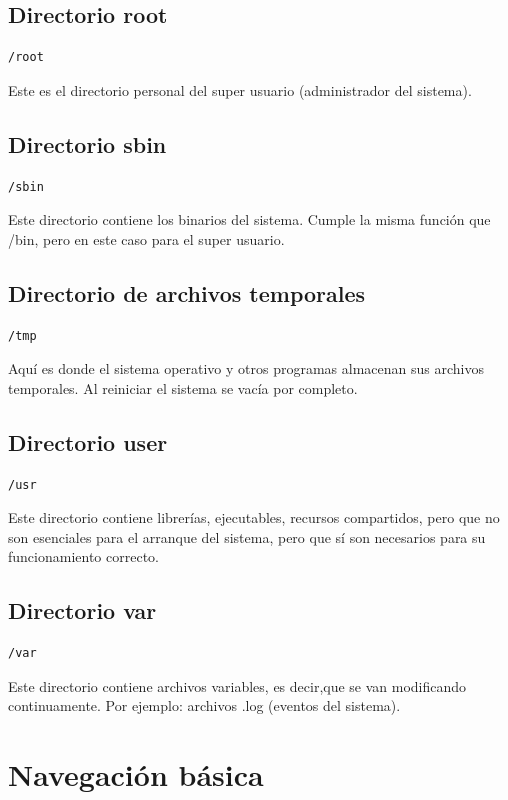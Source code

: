 \subsection{Directorio root}
\begin{lstlisting}
/root
\end{lstlisting}
Este es el directorio personal del super usuario (administrador del sistema).

\subsection{Directorio sbin}
\begin{lstlisting}
/sbin
\end{lstlisting}
Este directorio contiene los binarios del sistema. Cumple la misma función que /bin, pero en este caso para el super usuario.

\subsection{Directorio de archivos temporales}
\begin{lstlisting}
/tmp
\end{lstlisting}
Aquí es donde el sistema operativo y otros programas almacenan sus archivos temporales. Al reiniciar el sistema se vacía por completo.

\subsection{Directorio user}
\begin{lstlisting}
/usr
\end{lstlisting}
Este directorio contiene librerías, ejecutables, recursos compartidos, pero que no son esenciales para el arranque del sistema, pero que sí son necesarios para su funcionamiento correcto.

\subsection{Directorio var}
\begin{lstlisting}
/var
\end{lstlisting}
Este directorio contiene archivos variables, es decir,que se van modificando continuamente. Por ejemplo: archivos .log (eventos del sistema).


\newpage

\section{Navegación básica}

